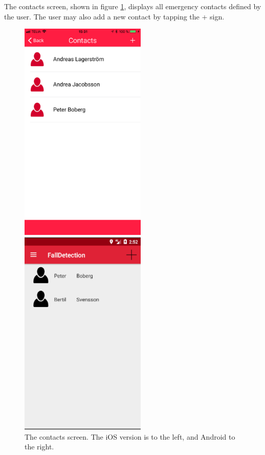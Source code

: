 \documentclass[12pt, a4paper, onecolumn]{article}
\begin{document}
	The contacts screen, shown in figure \ref{fig:contacts-screen}, displays all emergency contacts defined by the user. The user may also add a new contact by tapping the + sign. 
	
	\begin{figure}[H]
		\begin{multicols}{2}
			\centering
			\includegraphics[width=6cm]{../img/screenshots/contacts-screen.jpg}\par 
			\includegraphics[width=6cm]{../img/screenshots/contacts-screen-android.png}\par 
		\end{multicols}
		\caption{The contacts screen. The iOS version is to the left, and Android to the right.}%
		\label{fig:contacts-screen}%
	\end{figure}
	
\end{document}
